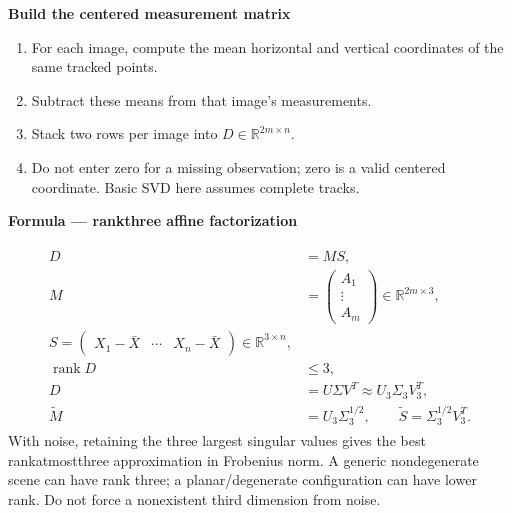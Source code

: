\documentclass[letterpaper,11pt,english,openany,oneside]{jupyterBook}
\begin{document}
\begin{TextbookBox}
\textbf{Build the centered measurement matrix}\par\smallskip
\begin{enumerate}
%
\item {}
\sphinxAtStartPar
For each image, compute the mean horizontal and vertical coordinates of the same tracked points.

\item {}
\sphinxAtStartPar
Subtract these means from that image’s measurements.

\item {}
\sphinxAtStartPar
Stack two rows per image into \(D\in\mathbb R^{2m\times n}\).

\item {}
\sphinxAtStartPar
Do not enter zero for a missing observation; zero is a valid centered coordinate. Basic SVD here assumes complete tracks.

\end{enumerate}

\end{TextbookBox}


\begin{TextbookBox}
\textbf{Formula — rank\sphinxhyphen{}three affine factorization}\par\smallskip
\begin{equation}\label{equation:lectures/lecture06/factorization:eq-lec06-factorization}
\begin{split}\begin{aligned}
D&=MS,\\
M&=\begin{pmatrix}A_1\\\vdots\\A_m\end{pmatrix}\in\mathbb R^{2m\times3},\\
S=\begin{pmatrix}X_1-\bar X&\cdots&X_n-\bar X\end{pmatrix}\in\mathbb R^{3\times n},\\
\operatorname{rank}D&\le3,\\
D&=U\Sigma V^T\approx U_3\Sigma_3V_3^T,\\
\widetilde M&=U_3\Sigma_3^{1/2},\qquad
\widetilde S=\Sigma_3^{1/2}V_3^T.
\end{aligned}\end{split}
\end{equation}
\sphinxAtStartPar
With noise, retaining the three largest singular values gives the best rank\sphinxhyphen{}at\sphinxhyphen{}most\sphinxhyphen{}three approximation in Frobenius norm. A generic nondegenerate scene can have rank three; a planar/degenerate configuration can have lower rank. Do not force a nonexistent third dimension from noise.

\end{TextbookBox}
\end{document}
